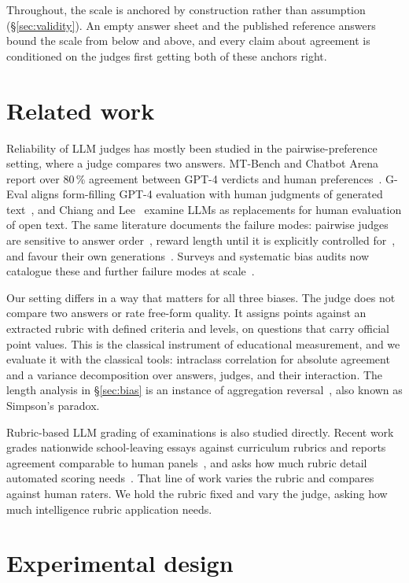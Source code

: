 \documentclass{article}
\begin{document}
Throughout, the scale is anchored by construction rather than assumption
(\S\ref{sec:validity}). An empty answer sheet and the published reference
answers bound the scale from below and above, and every claim about agreement
is conditioned on the judges first getting both of these anchors right.

\section{Related work}

Reliability of LLM judges has mostly been studied in the pairwise-preference
setting, where a judge compares two answers. MT-Bench and Chatbot Arena report
over 80\,\% agreement between GPT-4 verdicts and human
preferences~\cite{zheng2023}. G-Eval aligns form-filling GPT-4 evaluation with
human judgments of generated text~\cite{liu2023}, and Chiang and
Lee~\cite{chiang2023} examine LLMs as replacements for human evaluation of
open text. The same literature documents the failure modes: pairwise judges
are sensitive to answer order~\cite{wang2023}, reward length until it is
explicitly controlled for~\cite{dubois2024}, and favour their own
generations~\cite{panickssery2024}. Surveys and systematic bias audits now
catalogue these and further failure modes at scale~\cite{gu2024,ye2025}.

Our setting differs in a way that matters for all three biases. The judge does
not compare two answers or rate free-form quality. It assigns points against
an extracted rubric with defined criteria and levels, on questions that carry
official point values. This is the classical instrument of educational
measurement, and we evaluate it with the classical tools: intraclass
correlation for absolute agreement~\cite{shroutfleiss1979} and a variance
decomposition over answers, judges, and their interaction. The length analysis
in \S\ref{sec:bias} is an instance of aggregation reversal~\cite{simpson1951},
also known as Simpson's paradox.

Rubric-based LLM grading of examinations is also studied directly. Recent
work grades nationwide school-leaving essays against curriculum rubrics and
reports agreement comparable to human panels~\cite{karjus2026}, and asks how
much rubric detail automated scoring needs~\cite{yoshida2025}. That line of
work varies the rubric and compares against human raters. We hold the rubric
fixed and vary the judge, asking how much intelligence rubric application
needs.

\section{Experimental design}
\label{sec:design}
\end{document}
